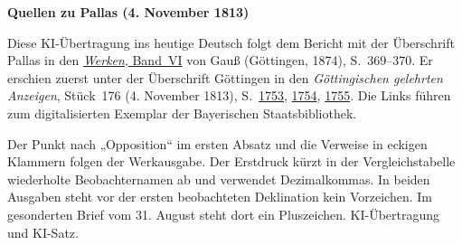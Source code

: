 \clearpage\thispagestyle{empty}
\begin{center}\textbf{Quellen zu Pallas (4. November 1813)}\end{center}
\noindent Diese KI-Übertragung ins heutige Deutsch folgt dem Bericht mit der Überschrift Pallas in den \href{https://gdz.sub.uni-goettingen.de/id/PPN236007467}{\textit{Werken}, Band~VI} von Gauß (Göttingen, 1874), S.~369--370. Er erschien zuerst unter der Überschrift Göttingen in den \textit{Göttingischen gelehrten Anzeigen}, Stück~176 (4. November 1813), S.~\href{https://api.digitale-sammlungen.de/iiif/image/v2/bsb10538684_00729/full/1600,/0/default.jpg}{1753}, \href{https://api.digitale-sammlungen.de/iiif/image/v2/bsb10538684_00730/full/1600,/0/default.jpg}{1754}, \href{https://api.digitale-sammlungen.de/iiif/image/v2/bsb10538684_00731/full/1600,/0/default.jpg}{1755}. Die Links führen zum digitalisierten Exemplar der Bayerischen Staatsbibliothek.
\par\smallskip\noindent Der Punkt nach „Opposition“ im ersten Absatz und die Verweise in eckigen Klammern folgen der Werkausgabe. Der Erstdruck kürzt in der Vergleichstabelle wiederholte Beobachternamen ab und verwendet Dezimalkommas. In beiden Ausgaben steht vor der ersten beobachteten Deklination kein Vorzeichen. Im gesonderten Brief vom 31. August steht dort ein Pluszeichen. KI-Übertragung und KI-Satz.
\clearpage
